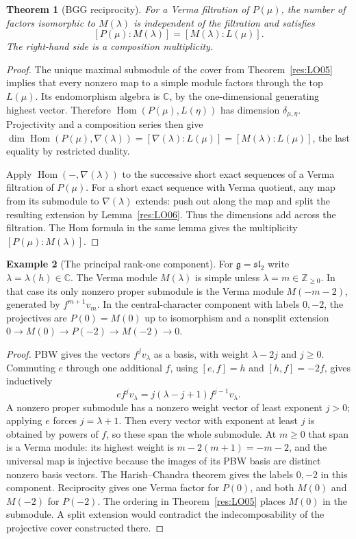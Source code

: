 \documentclass[11pt,oneside,openany]{book}
\newtheorem{theorem}{Theorem}[chapter]
\theoremstyle{definition}
\newtheorem{example}[theorem]{Example}
\theoremstyle{remark}
\begin{document}
\begin{theorem}[BGG reciprocity]
\label{res:LO07}
For a Verma filtration of \(P(\mu)\), the number of factors
isomorphic to \(M(\lambda)\) is independent of the filtration
and satisfies
\[
 [P(\mu):M(\lambda)]=[M(\lambda):L(\mu)] .
\]
The right-hand side is a composition multiplicity.
\end{theorem}
\begin{proof}
The unique maximal submodule of the cover from
Theorem~\ref{res:LO05} implies that every nonzero map to a
simple module factors through the top \(L(\mu)\).
Its endomorphism algebra is \(\mathbb C\), by the
one-dimensional generating highest vector. Therefore
\(\operatorname{Hom}(P(\mu),L(\eta))\) has dimension
\(\delta_{\mu,\eta}\). Projectivity and a composition
series then give
\(\dim\operatorname{Hom}(P(\mu),\nabla(\lambda))
=[\nabla(\lambda):L(\mu)]=[M(\lambda):L(\mu)]\),
the last equality by restricted duality.

Apply \(\operatorname{Hom}(-,\nabla(\lambda))\) to the successive
short exact sequences of a Verma filtration of \(P(\mu)\).
For a short exact sequence with Verma quotient, any map
from its submodule to \(\nabla(\lambda)\) extends: push
out along the map and split the resulting extension by
Lemma~\ref{res:LO06}. Thus the dimensions add across the
filtration. The Hom formula in the same lemma gives the
multiplicity \([P(\mu):M(\lambda)]\).
\end{proof}

\begin{example}[The principal rank-one component]
\label{res:LO08}
For \(\mathfrak g=\mathfrak{sl}_2\) write
\(\lambda=\lambda(h)\in\mathbb C\). The Verma module
\(M(\lambda)\) is simple unless \(\lambda=m\in\mathbb Z_{\ge0}\).
In that case its only nonzero proper submodule is the
Verma module \(M(-m-2)\), generated by \(f^{m+1}v_m\).
In the central-character component with labels \(0,-2\),
the projectives are \(P(0)=M(0)\) up to isomorphism and a
nonsplit extension \(0\to M(0)\to P(-2)\to M(-2)\to0\).
\end{example}
\begin{proof}
PBW gives the vectors \(f^j v_\lambda\) as a basis, with
weight \(\lambda-2j\) and \(j\ge0\). Commuting \(e\)
through one additional \(f\), using \([e,f]=h\) and
\([h,f]=-2f\), gives inductively
\[
  e f^j v_\lambda=j(\lambda-j+1) f^{j-1}v_\lambda .
\]
A nonzero proper submodule has a nonzero weight vector of
least exponent \(j>0\); applying \(e\) forces \(j=\lambda+1\).
Then every vector with exponent at least \(j\) is obtained
by powers of \(f\), so these span the whole submodule.
At \(m\ge0\) that span is a Verma module: its highest
weight is \(m-2(m+1)=-m-2\), and the universal map is
injective because the images of its PBW basis are distinct
nonzero basis vectors.
The Harish--Chandra theorem gives the labels \(0,-2\)
in this component. Reciprocity gives one Verma factor
for \(P(0)\), and both \(M(0)\) and \(M(-2)\) for \(P(-2)\).
The ordering in Theorem~\ref{res:LO05} places \(M(0)\) in
the submodule. A split extension would contradict the
indecomposability of the projective cover constructed there.
\end{proof}
\end{document}
